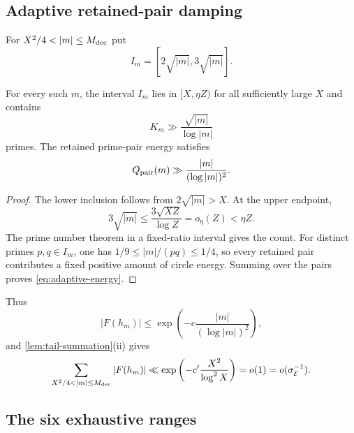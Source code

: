 \subsection{Adaptive retained-pair damping}

For $X^2/4<|m|\leq M_{\rm dec}$ put
\[
 I_m=[2\sqrt{|m|},3\sqrt{|m|}].
\]

\begin{proposition}
\label{prop:adaptive-prime-interval}
For every such $m$, the interval $I_m$ lies in $[X,\eta Z)$ for all sufficiently large $X$ and contains
\[
 K_m\gg\frac{\sqrt{|m|}}{\log|m|}
\]
primes. The retained prime-pair energy satisfies
\begin{equation}
\label{eq:adaptive-energy}
 Q_{\rm pair}(m)\gg\frac{|m|}{(\log|m|)^2}.
\end{equation}
\end{proposition}
\begin{proof}
The lower inclusion follows from $2\sqrt{|m|}>X$. At the upper endpoint,
\[
 3\sqrt{|m|}\leq\frac{3\sqrt{XZ}}{\log Z}=o_\eta(Z)<\eta Z.
\]
The prime number theorem in a fixed-ratio interval gives the count. For distinct primes $p,q\in I_m$, one has $1/9\leq|m|/(pq)\leq1/4$, so every retained pair contributes a fixed positive amount of circle energy. Summing over the pairs proves \cref{eq:adaptive-energy}.
\end{proof}

Thus
\[
 |F(h_m)|\leq\exp\left(-c\frac{|m|}{(\log|m|)^2}\right),
\]
and \cref{lem:tail-summation}(ii) gives
\begin{equation}
\label{eq:adaptive-total}
 \sum_{X^2/4<|m|\leq M_{\rm dec}}|F(h_m)|
 \ll\exp\left(-c'\frac{X^2}{\log^2X}\right)
 =o(1)=o(\sigma_{\mathcal E}^{-1}).
\end{equation}

\subsection{The six exhaustive ranges}

